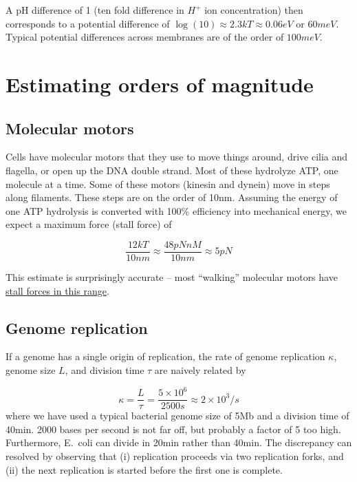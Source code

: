 A pH difference of 1 (ten fold difference in $H^+$ ion concentration) then corresponds to a potential difference of
$\log(10) \approx 2.3 kT \approx 0.06 eV$ or $60meV$.
Typical potential differences across membranes are of the order of $100meV$.

\section{Estimating orders of magnitude}

\subsection{Molecular motors}
Cells have molecular motors that they use to move things around, drive cilia and flagella, or open up the DNA double strand.
Most of these hydrolyze ATP, one molecule at a time.
Some of these motors (kinesin and dynein) move in steps along filaments.
These steps are on the order of 10nm.
Assuming the energy of one ATP hydrolysis is converted with 100\% efficiency into mechanical energy, we expect a maximum force (stall force) of

\begin{equation}
\frac{12kT}{10nm} \approx \frac{48pN nM}{10nm} \approx 5pN
\end{equation}

This estimate is surprisingly accurate -- most ``walking'' molecular motors have \href{http://bionumbers.hms.harvard.edu/bionumber.aspx?&id=112209&ver=1&trm=stall%20force}{stall forces in this range}.


\subsection{Genome replication}
If a genome has a single origin of replication, the rate of genome replication $\kappa$, genome size $L$, and division time $\tau$ are naively related by

\begin{equation}
\kappa = \frac{L}{\tau} = \frac{5\times 10^{6}}{2500s} \approx 2\times 10^3/s
\end{equation}
where we have used a typical bacterial genome size of 5Mb and a division time of 40min.
2000 bases per second is not far off, but probably a factor of 5 too high.
Furthermore, E.~coli can divide in 20min rather than 40min.
The discrepancy can resolved by observing that (i) replication proceeds via two replication forks, and (ii) the next replication is started before the first one is complete.

